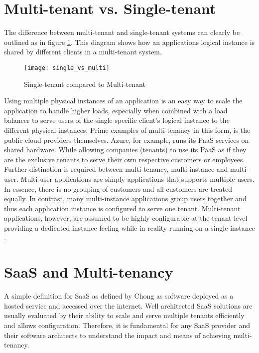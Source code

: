 \section{Multi-tenant vs. Single-tenant}

The difference between multi-tenant and single-tenant systems can clearly be outlined as in figure \ref{fig:multi-vs-single}. This diagram shows how an applications logical instance is shared by different clients in a multi-tenant system.

\begin{figure}
\centering
\texttt{[image: single\_vs\_multi]}
\caption{Single-tenant compared to Multi-tenant}
\label{fig:multi-vs-single}
\end{figure}

Using multiple physical instances of an application is an easy way to scale the application to handle higher loads, especially when combined with a load balancer to serve users of the single specific client's logical instance to the different physical instances. Prime examples of multi-tenancy in this form, is the public cloud providers themselves. Azure, for example, runs its PaaS services on shared hardware. While allowing companies (tenants) to use its PaaS as if they are the exclusive tenants to serve their own respective customers or employees.
Further distinction is required between multi-tenancy, multi-instance  and multi-user. Multi-user applications are simply applications that supports multiple users. In essence, there is no grouping of customers and all customers are treated equally\cite{Bezemer:2010:MSA:1862372.1862393}. In contrast, many multi-instance applications group users together and thus each application instance is configured to serve one tenant. Multi-tenant applications, however, are assumed to be highly configurable at the tenant level providing a dedicated instance feeling while in reality running on a single instance \cite{Bezemer:2010:MSA:1862372.1862393}.

\section{SaaS and Multi-tenancy}

A simple definition for SaaS as defined by Chong \cite{Chong2006} as software deployed as a hosted service and accessed over the internet. Well architected SaaS solutions are usually evaluated by their ability to scale and serve multiple tenants efficiently and allows configuration. Therefore, it is fundamental for any SaaS provider and their software architects to understand the impact and means of achieving multi-tenancy.

